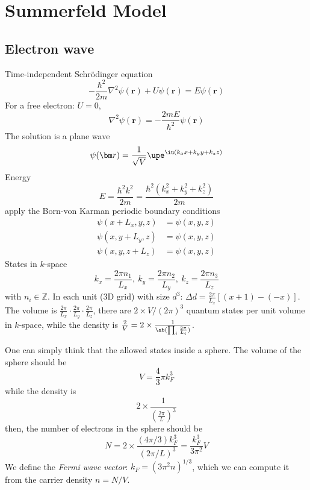 \section{Summerfeld Model}

\subsection{Electron wave}

Time-independent Schr\"odinger equation
\begin{equation}
  -\frac{\hbar^2}{2m} \nabla^2 \psi(\bm r) + U\psi(\bm r) = E\psi(\bm r)
\end{equation}
For a free electron: $U = 0$,
\[
  \nabla^2 \psi(\bm r) = -\frac{2mE}{\hbar^2}\psi(\bm r)
\]
The solution is a plane wave
\begin{equation}
  \psi(\bm r) = \frac1{\sqrt V}\upe^{\iu(k_xx+k_yy+k_zz)}
\end{equation}
Energy
\begin{equation}
  E = \frac{\hbar^2k^2}{2m} = \frac{\hbar^2(k_x^2 + k_y^2 + k_z^2)}{2m}
\end{equation}
apply the Born-von Karman periodic boundary conditions
\begin{equation}
  \begin{aligned}
    \psi(x + L_x,y,z) & = \psi(x,y,z)\\
    \psi(x,y + L_y,z) & = \psi(x,y,z)\\
    \psi(x,y,z + L_z) & = \psi(x,y,z)
  \end{aligned}
\end{equation}
States in $k$-space
\begin{equation}
  k_x = \frac{2\pi n_1}{L_x},~
  k_y = \frac{2\pi n_2}{L_y},~
  k_z = \frac{2\pi n_3}{L_z}
\end{equation}
with $n_i \in \mathbb Z$.
In each unit (3D grid) with size $d^3$: $\Delta d = \frac{2\pi}{L_x}[(x + 1) - (-x)]$.
The volume is $\frac{2\pi}{L_x} \cdot \frac{2\pi}{L_y} \cdot \frac{2\pi}{L_z}$, there are $2 \times V/(2\pi)^3$ quantum states per unit volume in $k$-space, while the density is $\frac2V = 2 \times \frac{1}{\ab(\prod_i\frac{2\pi}{L_i})}$.

One can simply think that the allowed states inside a sphere.
The volume of the sphere should be
\[
  V = \frac43\pi k_F^3
\]
while the density is
\[
  2 \times \frac1{(\frac{2\pi}{L})^3}
\]
then, the number of electrons in the sphere should be
\[
  N = 2 \times \frac{(4\pi/3)k_F^3}{(2\pi/L)^3} = \frac{k_F^3}{3\pi^2}V
\]
We define the \emph{Fermi wave vector}: $k_F = (3\pi^2 n)^{1/3}$, which we can compute it from the carrier density $n = N/V$.

